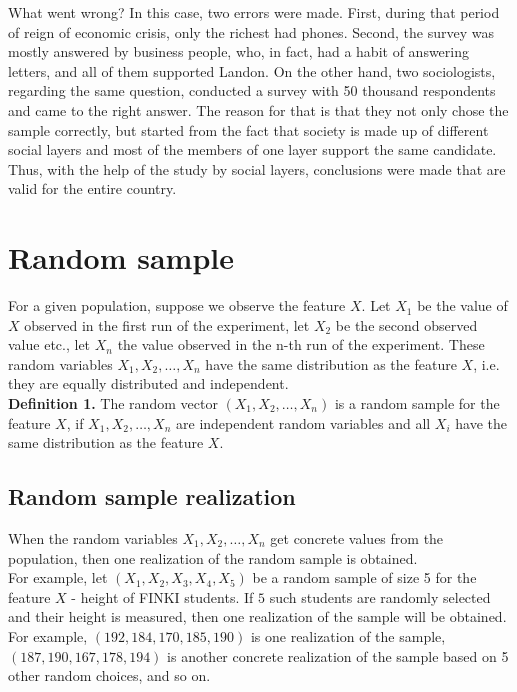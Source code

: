 \documentclass[a4paper, 12pt]{article}
\begin{document}
What went wrong? In this case, two errors were made. First, during that period of reign of economic crisis, only the richest had phones. Second, the survey was mostly answered by business people, who, in fact, had a habit of answering letters, and all of them supported Landon. On the other hand, two sociologists, regarding the same question, conducted a survey with 50 thousand respondents and came to the right answer. The reason for that is that they not only chose the sample correctly, but started from the fact that society is made up of different social layers and most of the members of one layer support the same candidate. Thus, with the help of the study by social layers, conclusions were made that are valid for the entire country.

\section{Random sample}

For a given population, suppose we observe the feature $X$. Let $X_1$ be the value of $X$ observed in the first run of the experiment, let $X_2$ be the second observed value etc., let $X_n$ the value observed in the n-th run of the experiment. These random variables $X_1, X_2, \dots ,X_n$ have the same distribution as the feature $X$, i.e. they are equally distributed and independent. \\

\textbf{Definition 1.} The random vector $(X_1, X_2, \dots ,X_n)$ is a random sample for the feature $X$, if $X_1, X_2, \dots,X_n$ are independent random variables and all $X_i$ have the same distribution as the feature $X$.\\


\subsection{Random sample realization}

When the random variables $X_1, X_2, \dots ,X_n$ get concrete values from the population, then one realization of the random sample is obtained.\\

For example, let $(X_1, X_2, X_3, X_4, X_5)$ be a random sample of size 5 for the feature $X$ - height of FINKI students. If $5$ such students are randomly selected and their height is measured, then one realization of the sample will be obtained. For example, $(192, 184, 170, 185, 190)$ is one realization of the sample, $(187, 190, 167, 178, 194)$ is another concrete realization of the sample based on 5 other random choices, and so on.\\
\end{document}

